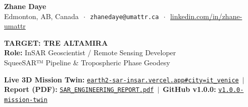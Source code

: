 \documentclass[10pt,letterpaper]{article}
\begin{document}
\begin{tcolorbox}[colframe=altamiraemerald,colback=altamiraemerald,coltext=white,boxrule=0pt,top=6pt,bottom=6pt]
\begin{minipage}[c]{0.58\textwidth}
    {\Large\textbf{Zhane Daye}} \\[2pt]
    {\footnotesize Edmonton, AB, Canada $\,\cdot\,$ \texttt{zhanedaye@umattr.ca} $\,\cdot\,$ \href{https://www.linkedin.com/in/zhane-umattr}{linkedin.com/in/zhane-umattr}}
\end{minipage}
\hfill
\begin{minipage}[c]{0.40\textwidth}
    \raggedleft
    {\large\textbf{TARGET: TRE ALTAMIRA}}\\[1pt]
    {\footnotesize\textbf{Role:} InSAR Geoscientist / Remote Sensing Developer}\\[1pt]
    {\scriptsize SqueeSAR™ Pipeline \& Tropospheric Phase Geodesy}
\end{minipage}
\end{tcolorbox}

\vspace{-4pt}

\begin{tcolorbox}[colframe=bordergray,colback=lightbg,top=3pt,bottom=3pt]
\footnotesize
\textbf{Live 3D Mission Twin:} \href{https://earth2-sar-insar.vercel.app#city=it_venice&preset=sar_focus&stage=v3}{\texttt{earth2-sar-insar.vercel.app\#city=it\_venice}} $\,\vert\,$ 
\textbf{Report (PDF):} \href{https://earth2-sar-insar.vercel.app/reports/EARTH2_X_BAND_SAR_INSAR_ENGINEERING_REPORT.pdf}{\texttt{SAR\_ENGINEERING\_REPORT.pdf}} $\,\vert\,$ 
\textbf{GitHub v1.0.0:} \href{https://github.com/zrt219/earth2studio/releases/tag/v1.0.0-mission-twin}{\texttt{v1.0.0-mission-twin}}
\end{tcolorbox}

\vspace{-4pt}
\end{document}
